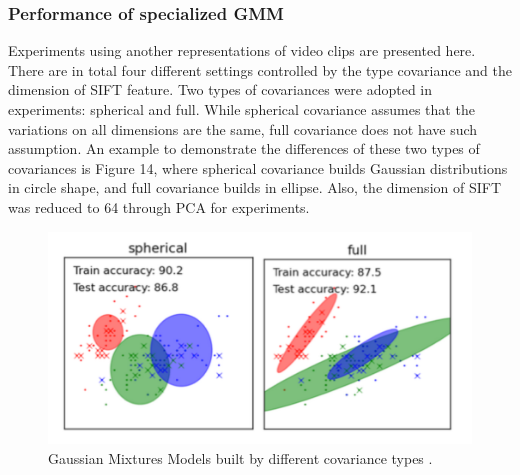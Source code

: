\subsubsection{Performance of specialized GMM}
\begin{table}[!ht]
  \begin{center}
    \end{center}
    \caption{Means and standard deviations (percent) of MAPs over six events using different GMMs}
\end{table}
\noindent Experiments using another representations of video clips are presented here. There are in total four different settings controlled by the type covariance and the dimension of SIFT feature. Two types of covariances were adopted in experiments: spherical and full. While spherical covariance assumes that the variations on all dimensions are the same, full covariance does not have such assumption. An example to demonstrate the differences of these two types of covariances is Figure 14, where spherical covariance builds Gaussian distributions in circle shape, and full covariance builds in ellipse. Also, the dimension of SIFT was reduced to 64 through PCA for experiments. \\ 

\begin{figure}[!ht]
\centering
  \includegraphics[scale = 0.6]{./DifCov.png}
\caption{Gaussian Mixtures Models built by different covariance types \cite{scikit-learn}.}
\end{figure}

